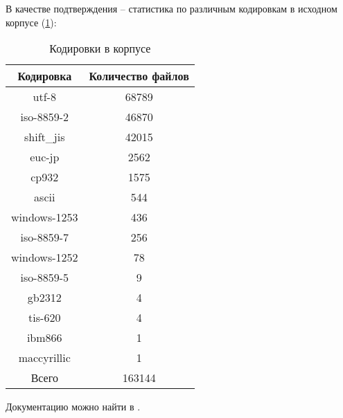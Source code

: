 В качестве подтверждения -- статистика по различным кодировкам в исходном корпусе (\cref{table:encodings}):

\begin{table}[H]
	\begin{center}
		\begin{tabular}{|c|c|} \hline
			Кодировка & Количество файлов \\ \hline 
			utf-8 & 68789\\ 
			iso-8859-2 & 46870\\ 
			shift\_jis & 42015\\ 
			euc-jp & 2562\\ 
			cp932 & 1575\\ 
			ascii & 544\\ 
			windows-1253 & 436\\ 
			iso-8859-7 & 256\\ 
			windows-1252 & 78\\ 
			iso-8859-5 & 9\\ 
			gb2312 & 4\\ 
			tis-620 & 4\\ 
			ibm866 & 1\\ 
			maccyrillic & 1\\ \hline
			Всего & 163144 \\ \hline
		\end{tabular}
	\caption{Кодировки в корпусе}
	\label{table:encodings}
	\end{center}
\end{table}


Документацию можно найти в \cite{python:dammit}.

%
%
